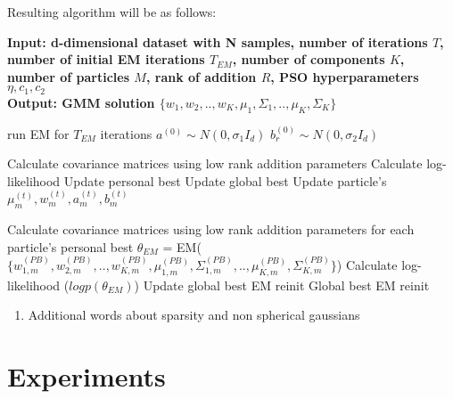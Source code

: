 \documentclass[a4paper]{article}
\begin{document}
Resulting algorithm will be as follows:

\begin{algorithm}
    \caption{}\label{alg:cap}
    \hspace*{\algorithmicindent} \textbf{Input: d-dimensional dataset with N samples, number of iterations $T$, number of initial EM iterations $T_{EM}$, 
    number of components $K$, number of particles $M$, rank of addition $R$,
    PSO hyperparameters $\eta, c_1, c_2$} \\
    \hspace*{\algorithmicindent} \textbf{Output: GMM solution $\{w_1, w_2, .., w_K, \mu_1, \Sigma_1, .., \mu_K, \Sigma_K\}$} 
    \begin{algorithmic}
    \State run EM for $T_{EM}$ iterations
        \State $a^{(0)}\sim N(0, \sigma_1I_d)$ 
            \State $b^{(0)}_r \sim N(0, \sigma_2 I_d)$
        \EndFor
    \EndFor
    
            \State Calculate covariance matrices using low rank addition parameters
            \State Calculate log-likelihood
            \State Update personal best
         \EndFor
         \State Update global best
            \State Update particle's $\mu_m^{(t)}, w_m^{(t)}, a_m^{(t)}, b_m^{(t)}$
         \EndFor
     \EndFor
     
        \State Calculate covariance matrices using low rank addition parameters for each particle's personal best
        \State $\theta_{EM}$ = EM($\{w_{1, m}^{(PB)}, w_{2, m}^{(PB)}, .., w_{K, m}^{(PB)}, \mu_{1, m}^{(PB)}, \Sigma_{1, m}^{(PB)}, .., \mu_{K, m}^{(PB)}, \Sigma_{K, m}^{(PB)}\}$)
        \State Calculate log-likelihood ($logp(\theta_{EM})$)
     \EndFor
     \State Update global best EM reinit
     \State \Return Global best EM reinit
    \end{algorithmic}
\end{algorithm}

\begin{enumerate}
    \item Additional words about sparsity and non spherical gaussians
\end{enumerate}

\section{Experiments}
\end{document}
